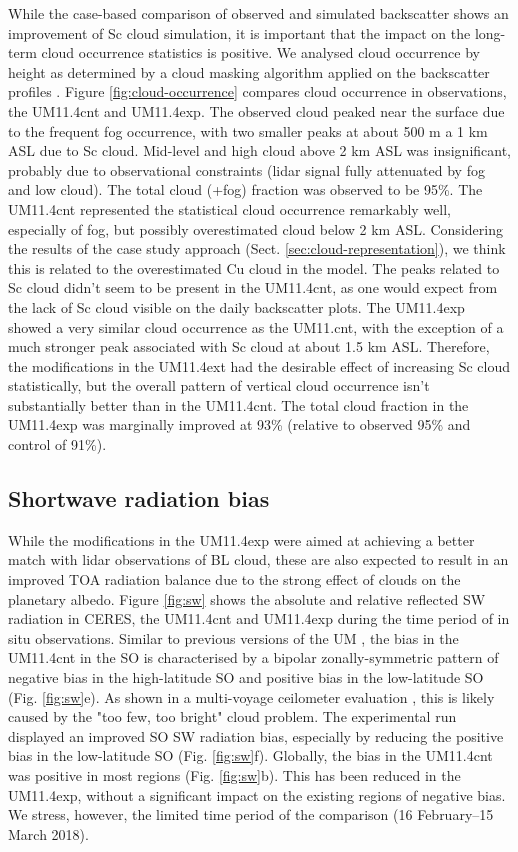 While the case-based comparison of observed and simulated backscatter
shows an improvement of Sc cloud simulation, it is important that the impact
on the long-term cloud occurrence statistics is positive. We analysed
cloud occurrence by height as determined by a cloud masking algorithm
applied on the backscatter profiles \citep{kuma2020}.
Figure \ref{fig:cloud-occurrence} compares cloud occurrence in observations,
the UM11.4cnt and UM11.4exp. The observed cloud peaked near the surface due to
the frequent fog occurrence,
with two smaller peaks at about 500 m a 1 km ASL due to Sc cloud.
Mid-level and high cloud above 2 km ASL was insignificant, probably due
to observational constraints (lidar signal fully attenuated by fog and low
cloud). The total cloud (+fog) fraction was observed to be 95\%.
The UM11.4cnt represented the statistical cloud occurrence remarkably well,
especially of fog, but possibly overestimated cloud below 2 km ASL. Considering
the results of the case study approach (Sect. \ref{sec:cloud-representation}), we think this is related to the
overestimated Cu cloud in the model. The peaks related to Sc cloud didn't seem
to be present in the UM11.4cnt, as one would expect from the lack of Sc cloud
visible on the daily backscatter plots. The UM11.4exp showed a very similar
cloud occurrence as the UM11.cnt, with the exception of a much stronger peak
associated with Sc cloud at about 1.5 km ASL. Therefore, the modifications
in the UM11.4ext had the desirable effect of increasing Sc cloud statistically,
but the overall pattern of vertical cloud occurrence isn't substantially better
than in the UM11.4cnt. The total cloud fraction in the UM11.4exp was marginally
improved at 93\% (relative to observed 95\% and control of 91\%).

\subsection{Shortwave radiation bias}
\label{sec:sw-bias}

While the modifications in the UM11.4exp were aimed at achieving a better
match with lidar observations of BL cloud, these are also expected to
result in an improved TOA radiation balance due to the strong effect of
clouds on the planetary albedo. Figure \ref{fig:sw} shows the absolute
and relative reflected SW radiation in CERES, the UM11.4cnt and UM11.4exp
during the time period of in situ observations. Similar to previous
versions of the UM \citep{kuma2019,schuddeboom2019}, the bias in the UM11.4cnt
in the SO is characterised by a bipolar zonally-symmetric pattern of negative
bias in the high-latitude SO
and positive bias in the low-latitude SO (Fig. \ref{fig:sw}e).
As shown in a multi-voyage ceilometer
evaluation \citep{kuma2019}, this is likely caused by the "too few, too bright"
cloud problem. The experimental run displayed an improved SO SW radiation
bias, especially by reducing the positive bias in the low-latitude SO
(Fig. \ref{fig:sw}f). Globally, the bias in the UM11.4cnt was positive in most
regions (Fig. \ref{fig:sw}b). This has been reduced in the UM11.4exp, without
a significant impact on the existing regions of negative bias. We stress,
however, the limited time period of the comparison (16 February--15 March 2018).

